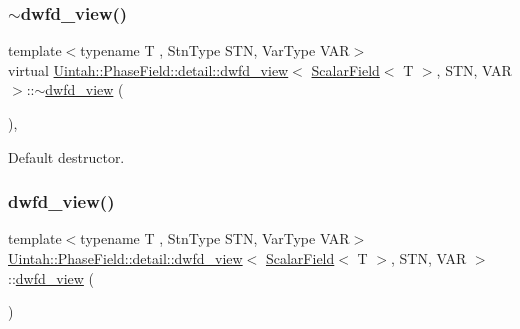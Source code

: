 \subsubsection{\texorpdfstring{$\sim$dwfd\+\_\+view()}{~dwfd\_view()}}
{\footnotesize\ttfamily template$<$typename T , Stn\+Type S\+TN, Var\+Type V\+AR$>$ \\
virtual \hyperlink{classUintah_1_1PhaseField_1_1detail_1_1dwfd__view}{Uintah\+::\+Phase\+Field\+::detail\+::dwfd\+\_\+view}$<$ \hyperlink{structUintah_1_1PhaseField_1_1ScalarField}{Scalar\+Field}$<$ T $>$, S\+TN, V\+AR $>$\+::$\sim$\hyperlink{classUintah_1_1PhaseField_1_1detail_1_1dwfd__view}{dwfd\+\_\+view} (\begin{DoxyParamCaption}{ }\end{DoxyParamCaption})\hspace{0.3cm}{\ttfamily [virtual]}, {\ttfamily [default]}}



Default destructor. 

\mbox{\label{classUintah_1_1PhaseField_1_1detail_1_1dwfd__view_3_01ScalarField_3_01T_01_4_00_01STN_00_01VAR_01_4_a09d1b78273bc5111d169326c7ed6e84d}} 
\subsubsection{\texorpdfstring{dwfd\+\_\+view()}{dwfd\_view()}}
{\footnotesize\ttfamily template$<$typename T , Stn\+Type S\+TN, Var\+Type V\+AR$>$ \\
\hyperlink{classUintah_1_1PhaseField_1_1detail_1_1dwfd__view}{Uintah\+::\+Phase\+Field\+::detail\+::dwfd\+\_\+view}$<$ \hyperlink{structUintah_1_1PhaseField_1_1ScalarField}{Scalar\+Field}$<$ T $>$, S\+TN, V\+AR $>$\+::\hyperlink{classUintah_1_1PhaseField_1_1detail_1_1dwfd__view}{dwfd\+\_\+view} (\begin{DoxyParamCaption}\item[{const \hyperlink{classUintah_1_1PhaseField_1_1detail_1_1dwfd__view}{dwfd\+\_\+view}$<$ \hyperlink{structUintah_1_1PhaseField_1_1ScalarField}{Scalar\+Field}$<$ T $>$, S\+TN, V\+AR $>$ \&}]{ }\end{DoxyParamCaption})\hspace{0.3cm}{\ttfamily [delete]}}



